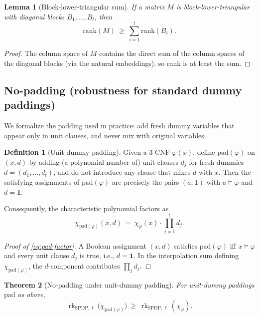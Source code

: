 \documentclass[12pt]{article}
\newtheorem{theorem}{Theorem}
\newtheorem{lemma}[theorem]{Lemma}
\theoremstyle{definition}
\newtheorem{definition}{Definition}
\theoremstyle{definition}
\theoremstyle{remark}
\theoremstyle{remark}
\begin{document}
\begin{lemma}[Block-lower-triangular sum]\label{lem:block-lower-tri}
If a matrix $M$ is block-lower-triangular with diagonal blocks $B_1,\dots,B_t$, then
\[
\mathrm{rank}(M)\ \ge\ \sum_{i=1}^t \mathrm{rank}(B_i).
\]
\end{lemma}

\begin{proof}
The column space of $M$ contains the direct sum of the column spaces of the diagonal blocks (via the natural embeddings), so rank is at least the sum.
\end{proof}

\subsection{No-padding (robustness for standard dummy paddings)}

We formalize the padding used in practice: add fresh dummy variables that appear only in unit clauses, and never mix with original variables.

\begin{definition}[Unit-dummy padding]\label{def:unit-dummy-pad}
Given a 3-CNF $\varphi(x)$, define $\mathrm{pad}(\varphi)$ on $(x,d)$ by adding (a polynomial number of) unit clauses $d_j$ for fresh dummies $d=(d_1,\dots,d_t)$, and do not introduce any clause that mixes $d$ with $x$. Then the satisfying assignments of $\mathrm{pad}(\varphi)$ are precisely the pairs $(a,\mathbf{1})$ with $a\models\varphi$ and $d=\mathbf{1}$.

Consequently, the characteristic polynomial factors as
\begin{equation}\label{eq:pad-factor}
\chi_{\mathrm{pad}(\varphi)}(x,d)\ =\ \chi_\varphi(x)\cdot\prod_{j=1}^t d_j.
\end{equation}
\end{definition}

\begin{proof}[Proof of \eqref{eq:pad-factor}]
A Boolean assignment $(x,d)$ satisfies $\mathrm{pad}(\varphi)$ iff $x\models\varphi$ and every unit clause $d_j$ is true, i.e., $d=\mathbf{1}$. In the interpolation sum defining $\chi_{\mathrm{pad}(\varphi)}$, the $d$-component contributes $\prod_j d_j$.
\end{proof}

\begin{theorem}[No-padding under unit-dummy padding]\label{thm:no-padding-unit}
For unit-dummy paddings $\mathrm{pad}$ as above,
\[
\operatorname{rk}_{\mathrm{SPDP},\ell}\bigl(\chi_{\mathrm{pad}(\varphi)}\bigr)\ \ge\ \operatorname{rk}_{\mathrm{SPDP},\ell}(\chi_\varphi).
\]
\end{theorem}
\end{document}
